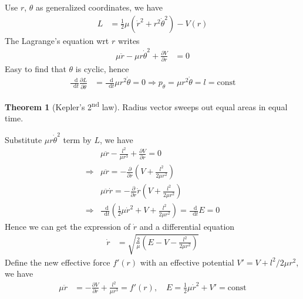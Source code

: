 \documentclass[twoside,9pt]{article}
\numberwithin{equation}{section} %
\newcommand{\lms}{\fontfamily{lmss}\selectfont} %
\renewcommand*\d{\mathop{}\!\mathrm{d}}
\theoremstyle{definition}
\newtheorem{theorem}{\lms Theorem}[section]
\theoremstyle{remark}
\begin{document}
Use $r$, $\theta$ as generalized coordinates, we have
\begin{align}
    L &= \frac{1}{2}\mu(\dot{r}^2 + r^2\dot{\theta}^2) - V(r)
\end{align}
The Lagrange's equation wrt $r$ writes
\begin{align}
    \mu\ddot{r}
    - \mu r\dot{\theta}^2
    + \frac{\partial V}{\partial r} &= 0
\end{align}
Easy to find that $\theta$ is cyclic, hence
\begin{align}
    \frac{\d}{\d t}\frac{\partial L}{\partial\dot\theta}
    &= \frac{\d}{\d t}\mu r^2\dot\theta = 0
    \Rightarrow p_\theta = \mu r^2\dot{\theta} = l = \text{const}
\end{align}
\begin{theorem}[Kepler's 2\textsuperscript{nd} law]
Radius vector sweeps out equal areas in equal time.
\end{theorem}
Substitute $\mu r\dot{\theta}^2$ term by $L$, we have
\begin{align}
    &\mu\ddot{r} - \frac{l^2}{\mu r^3} + \frac{\partial V}{\partial r} = 0\\
    \Rightarrow
    &\mu\ddot{r} = -\frac{\partial}{\partial r}(V + \frac{l^2}{2\mu r^2})\\
    &\mu\ddot{r}\dot{r} = -\frac{\partial}{\partial r} \dot{r}(V + \frac{l^2}{2\mu r^2})\\
    \Rightarrow
    &\frac{\d}{\d t}(\frac{1}{2}\mu\dot{r}^2 + V + \frac{l^2}{2\mu r^2}) = 
    \frac{\d }{\d t}E = 0
\end{align}
Hence we can get the expression of $\dot{r}$
and a differential equation
\begin{align}
    \dot{r} &= 
    \sqrt{
        \frac{2}{\mu}(E - V - \frac{l^2}{2\mu r^2})
    }
\end{align}
Define the new effective force $f'(r)$ with an 
effective potential $V'= V + l^2/2\mu r^2$, we have
\begin{align}
    \mu\ddot{r} &= 
    -\frac{\partial V}{\partial r} + \frac{l^2}{\mu r^3} 
    = f'(r),\quad
    E = \frac{1}{2}\mu\dot{r}^2 + V' = \text{const}
\end{align}
\end{document}
